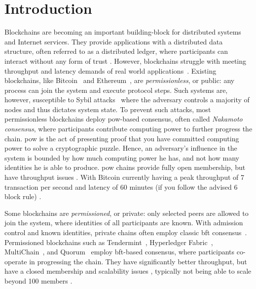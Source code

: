 \documentclass[USenglish]{uit-thesis}
\begin{document}
\chapter{Introduction}\label{chap:intro}
Blockchains are becoming an important building-block for distributed systems and Internet services. 
They provide applications with a distributed data structure, often referred to as a distributed ledger, where participants can interact without any form of trust \cite{bookblock, bitcoin}.
However, blockchains struggle with meeting throughput and latency demands of real world applications~\cite{quest, teddy, teddy2}.
Existing blockchains, like Bitcoin~\cite{bitcoin} and Ethereum~\cite{ether}, are \textit{permissionless}, or public: any process can join the system and execute protocol steps. 
Such systems are, however, susceptible to Sybil attacks~\cite{sybil} where the adversary controls a majority of nodes and thus dictates system state.
To prevent such attacks, most permissionless blockchains deploy \gls{pow}-based consensus, often called \textit{Nakamoto consensus}, where participants contribute computing power to further progress the chain.
\gls{pow} is the act of presenting proof that you have committed computing power to solve a cryptographic puzzle. 
Hence, an adversary's influence in the system is bounded by how much computing power he has, and not how many identities he is able to produce.
\gls{pow} chains provide fully open membership, but have throughput issues \cite{bitcoin, quest, algorand, scaleblock, teddy, teddy2}.
With Bitcoin currently having a peak throughput of 7 transaction per second and latency of 60 minutes (if you follow the advised 6 block rule) \cite{scaleblock}.


Some blockchains are \textit{permissioned}, or private: only selected peers are allowed to join the system, where identities of all participants are known.
With admission control and known identities, private chains often employ classic \gls{bft} consensus~\cite{pbft, smr, paxos, general}. 
Permissioned blockchains such as Tendermint~\cite{tendermint}, Hyperledger Fabric~\cite{hyper}, MultiChain~\cite{multichain}, and Quorum~\cite{quor} employ \gls{bft}-based consensus, where participants co-operate in progressing the chain.
They have significantly better throughput, but have a closed membership and scalability issues \cite{quest}, typically not being able to scale beyond 100 members \cite{pbft}.

\end{document}
